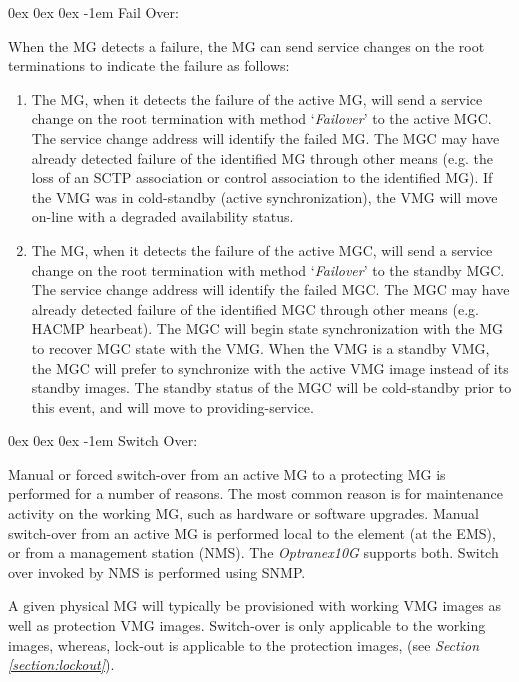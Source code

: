 \documentclass[letterpaper,final,notitlepage,twocolumn,10pt,twoside]{article}
\makeatletter
\let\normalsize = \small
\let\small = \footnotesize
\let\footnotesize = \scriptsize
\let\scriptsize = \tiny
\renewcommand\subparagraph{\@startsection{subparagraph}{5}{\parindent}%
                                       {0ex \@plus 0ex \@minus 0ex}%
                                       {-1em}%
                                      {\normalfont\normalsize\bfseries\slshape}}
\makeatother
\begin{document}
\subparagraph{Fail Over:}

When the MG detects a failure, the MG can send service changes on the root
terminations to indicate the failure as follows:

\begin{enumerate}

\item The MG, when it detects the failure of the active MG, will send a
service change on the root termination with method `{\it Failover}' to the
active MGC.  The service change address will identify the failed MG.  The MGC
may have already detected failure of the identified MG through other means
(e.g. the loss of an SCTP association or control association to the identified
MG).  If the VMG was in cold-standby (active synchronization), the VMG will
move on-line with a degraded availability status.

\item The MG, when it detects the failure of the active MGC, will send a
service change on the root termination with method `{\it Failover}' to the
standby MGC.  The service change address will identify the failed MGC.  The
MGC may have already detected failure of the identified MGC through other
means (e.g. HACMP hearbeat).  The MGC will begin state synchronization with
the MG to recover MGC state with the VMG.  When the VMG is a standby VMG, the
MGC will prefer to synchronize with the active VMG image instead of its
standby images.  The standby status of the MGC will be cold-standby prior to
this event, and will move to providing-service.

\end{enumerate}

\subparagraph{Switch Over:}
\label{section:switchover}

Manual or forced switch-over from an active MG to a protecting MG is performed
for a number of reasons.  The most common reason is for maintenance activity
on the working MG, such as hardware or software upgrades.  Manual switch-over
from an active MG is performed local to the element (at the EMS), or from a
management station (NMS).  The {\sl Optranex10G} supports both.  Switch over
invoked by NMS is performed using SNMP.

A given physical MG will typically be provisioned with working VMG images as
well as protection VMG images.  Switch-over is only applicable to the working
images, whereas, lock-out is applicable to the protection images, (see {\sl
Section \ref{section:lockout}}).
\end{document}
